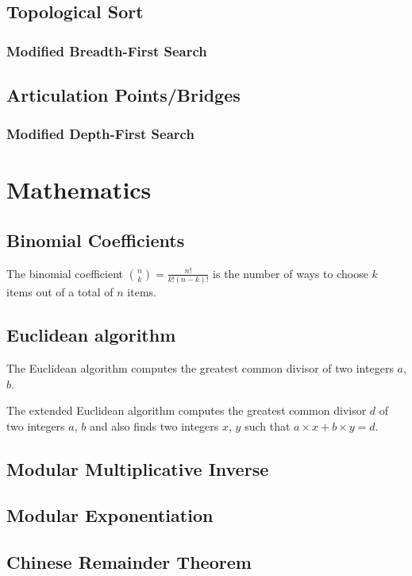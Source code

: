 \documentclass[11pt,a4paper,titlepage]{article}
\begin{document}
		\subsection{Topological Sort}
			\subsubsection{Modified Breadth-First Search}
		\subsection{Articulation Points/Bridges}
			\subsubsection{Modified Depth-First Search}

	\section{Mathematics}

		\subsection{Binomial Coefficients}
			The binomial coefficient $\binom{n}{k} = \frac{n!}{k!(n-k)!}$ is the number of ways to choose $k$ items out of a total of $n$ items.

			

			

			

		\subsection{Euclidean algorithm}
			The Euclidean algorithm computes the greatest common divisor of two integers $a$, $b$.
			

			The extended Euclidean algorithm computes the greatest common divisor $d$ of two integers $a$, $b$ and also finds two integers $x$, $y$ such that $a\times x + b\times y = d$.
			

		\subsection{Modular Multiplicative Inverse}
			

		\subsection{Modular Exponentiation}
			

		\subsection{Chinese Remainder Theorem}
			
\end{document}
